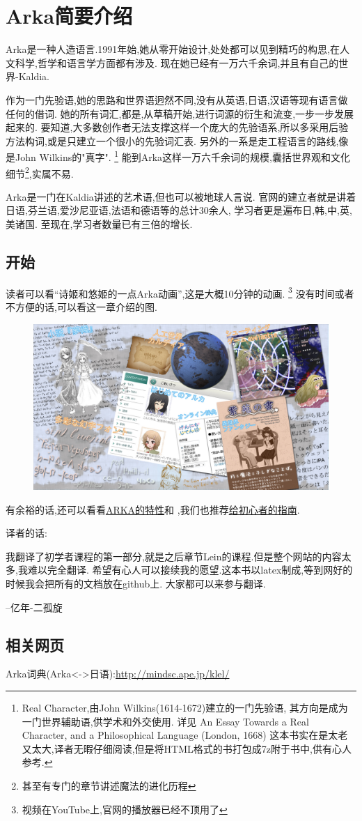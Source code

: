 \chapter{Arka简要介绍}
Arka是一种人造语言.1991年始,她从零开始设计,处处都可以见到精巧的构思,在人文科学,哲学和语言学方面都有涉及.
现在她已经有一万六千余词,并且有自己的世界-Kaldia.

作为一门先验语,她的思路和世界语迥然不同,没有从英语,日语,汉语等现有语言做任何的借词.
她的所有词汇,都是,从草稿开始,进行词源的衍生和流变,一步一步发展起来的.
要知道,大多数创作者无法支撑这样一个庞大的先验语系,所以多采用后验方法构词,或是只建立一个很小的先验词汇表.
另外的一系是走工程语言的路线,像是John Wilkins的"真字".
\footnote{Real Character,由John Wilkins(1614-1672)建立的一门先验语,
其方向是成为一门世界辅助语,供学术和外交使用.
详见
{An Essay Towards a Real Character, and a Philosophical Language (London, 1668)}
这本书实在是太老又太大,译者无暇仔细阅读,但是将HTML格式的书打包成7z附于书中,供有心人参考.
}
能到Arka这样一万六千余词的规模,囊括世界观和文化细节\footnote{甚至有专门的章节讲述魔法的进化历程},实属不易.

Arka是一门在Kaldia讲述的艺术语,但也可以被地球人言说.
官网的建立者就是讲着日语,芬兰语,爱沙尼亚语,法语和德语等的总计30余人,
学习者更是遍布日,韩,中,英,美诸国.
至现在,学习者数量已有三倍的增长.


\section{开始}
读者可以看``诗姬和悠姬的一点Arka动画'',这是大概10分钟的动画.
\footnote{视频在YouTube上,官网的播放器已经不顶用了}
没有时间或者不方便的话,可以看这一章介绍的图.
\begin{figure}[H]
\includegraphics[width=1\textwidth]{ARKA/leis.jpg}
\end{figure}
有余裕的话,还可以看看\href{http://www44.atwiki.jp/conlang_arka/pages/1.html}{ARKA的特性}和
,我们也推荐\href{http://conlinguistics.org/arka/e_study_kit.html}{给初心者的指南}.

\small{
译者的话:

我翻译了初学者课程的第一部分,就是之后章节Lein的课程.但是整个网站的内容太多,我难以完全翻译.
希望有心人可以接续我的愿望.这本书以latex制成,等到网好的时候我会把所有的文档放在github上.
大家都可以来参与翻译.

\quad --亿年-二孤旋
}
\section{相关网页}


Arka词典(Arka<->日语):\url{http://mindsc.ape.jp/klel/}
